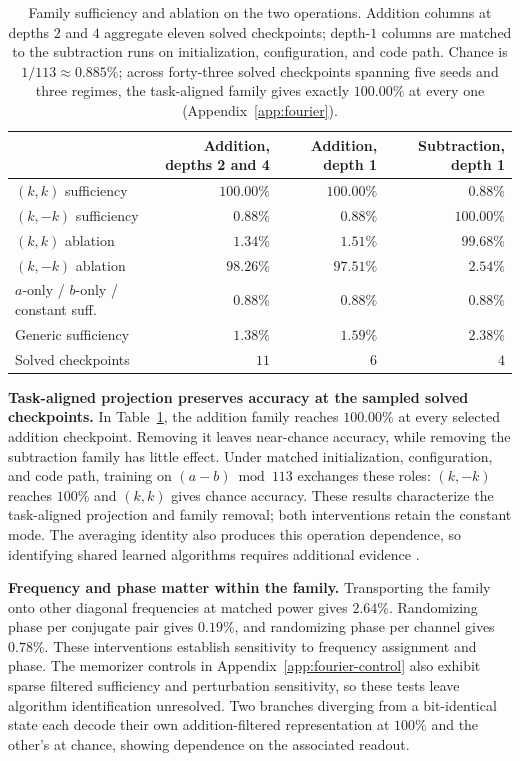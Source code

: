\documentclass{article}
\begin{document}
\begin{table}[!htbp]
\centering
\caption{Family sufficiency and ablation on the two operations. Addition columns at depths $2$ and $4$ aggregate eleven solved checkpoints; depth-$1$ columns are matched to the subtraction runs on initialization, configuration, and code path. Chance is $1/113\approx0.885\%$; across forty-three solved checkpoints spanning five seeds and three regimes, the task-aligned family gives exactly $100.00\%$ at every one (Appendix~\ref{app:fourier}).}
\label{tab:swap}
\small
\begin{tabular}{lrrr}
\toprule
 & Addition, depths 2 and 4 & Addition, depth 1 & Subtraction, depth 1 \\
\midrule
$(k,k)$ sufficiency & $100.00\%$ & $100.00\%$ & $0.88\%$ \\
$(k,-k)$ sufficiency & $0.88\%$ & $0.88\%$ & $100.00\%$ \\
$(k,k)$ ablation & $1.34\%$ & $1.51\%$ & $99.68\%$ \\
$(k,-k)$ ablation & $98.26\%$ & $97.51\%$ & $2.54\%$ \\
$a$-only / $b$-only / constant suff. & $0.88\%$ & $0.88\%$ & $0.88\%$ \\
Generic sufficiency & $1.38\%$ & $1.59\%$ & $2.38\%$ \\
Solved checkpoints & $11$ & $6$ & $4$ \\
\bottomrule
\end{tabular}
\end{table}

\textbf{Task-aligned projection preserves accuracy at the sampled solved checkpoints.} In Table~\ref{tab:swap}, the addition family reaches $100.00\%$ at every selected addition checkpoint. Removing it leaves near-chance accuracy, while removing the subtraction family has little effect. Under matched initialization, configuration, and code path, training on $(a-b)\bmod113$ exchanges these roles: $(k,-k)$ reaches $100\%$ and $(k,k)$ gives chance accuracy. These results characterize the task-aligned projection and family removal; both interventions retain the constant mode. The averaging identity also produces this operation dependence, so identifying shared learned algorithms requires additional evidence \citep{chughtai2023toy}.

\textbf{Frequency and phase matter within the family.} Transporting the family onto other diagonal frequencies at matched power gives $2.64\%$. Randomizing phase per conjugate pair gives $0.19\%$, and randomizing phase per channel gives $0.78\%$. These interventions establish sensitivity to frequency assignment and phase. The memorizer controls in Appendix~\ref{app:fourier-control} also exhibit sparse filtered sufficiency and perturbation sensitivity, so these tests leave algorithm identification unresolved. Two branches diverging from a bit-identical state each decode their own addition-filtered representation at $100\%$ and the other's at chance, showing dependence on the associated readout.
\end{document}

